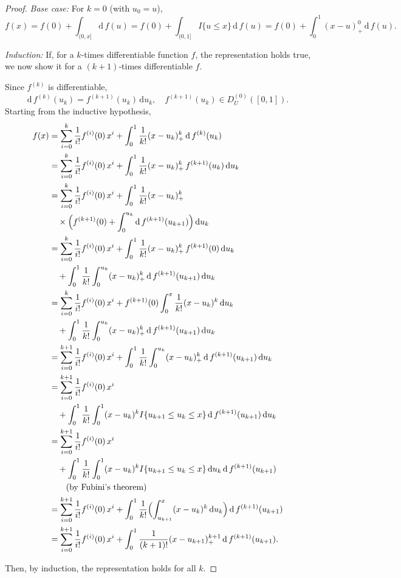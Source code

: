 \begin{proof}
\textit{Base case:} For $k = 0$ (with $u_0 = u$),
\[
  f(x)
  = f(0) + \int_{(0, x]} \mathrm{d}\,f(u)
  = f(0) + \int_{(0, 1]} I\{u \le x\}\,\mathrm{d}\,f(u)
  = f(0) + \int_0^1 (x - u)_+^0 \,\mathrm{d}\,f(u).
\]

\textit{Induction:} If, for a $k$‑times differentiable function $f$, the representation holds true, we now show it for a $(k+1)$‑times differentiable $f$.

Since $f^{(k)}$ is differentiable,
\[
  \mathrm{d}\,f^{(k)}(u_k) = f^{(k+1)}(u_k)\,\mathrm{d}u_k,
  \quad f^{(k+1)}(u_k)\in D^{(0)}_U([0,1]).
\]
Starting from the inductive hypothesis,
\begin{align*}\label{HAL_representation_formula}
  f(x)
  &= \sum_{i = 0}^k \frac{1}{i!}f^{(i)}(0)\,x^{i}
    + \int_0^1 \frac{1}{k!}(x - u_k)_+^k\,\mathrm{d}\,f^{(k)}(u_k) \\
  &= \sum_{i = 0}^k \frac{1}{i!}f^{(i)}(0)\,x^{i}
    + \int_0^1 \frac{1}{k!}(x - u_k)_+^k\,f^{(k+1)}(u_k)\,\mathrm{d}u_k \\
  &= \sum_{i = 0}^k \frac{1}{i!}f^{(i)}(0)\,x^{i}
    + \int_0^1 \frac{1}{k!}(x - u_k)_+^k \\
  &\quad \times \Bigl(f^{(k+1)}(0)
    + \int_0^{u_k} \mathrm{d}\,f^{(k+1)}(u_{k+1})\Bigr)\,\mathrm{d}u_k \\
  &= \sum_{i = 0}^k \frac{1}{i!}f^{(i)}(0)\,x^{i}
    + \int_0^1 \frac{1}{k!}(x - u_k)_+^k\,f^{(k+1)}(0)\,\mathrm{d}u_k \\
  &\quad + \int_0^1 \frac{1}{k!}\int_0^{u_k}(x - u_k)_+^k\,\mathrm{d}\,f^{(k+1)}(u_{k+1})\,\mathrm{d}u_k \\
  &= \sum_{i = 0}^k \frac{1}{i!}f^{(i)}(0)\,x^{i}
    + f^{(k+1)}(0)\int_0^x \frac{1}{k!}(x - u_k)^k\,\mathrm{d}u_k \\
  &\quad + \int_0^1 \frac{1}{k!}\int_0^{u_k}(x - u_k)_+^k\,\mathrm{d}\,f^{(k+1)}(u_{k+1})\,\mathrm{d}u_k \\
  &= \sum_{i = 0}^{k+1} \frac{1}{i!}f^{(i)}(0)\,x^{i}
    + \int_0^1 \frac{1}{k!}\int_0^{u_k}(x - u_k)_+^k\,\mathrm{d}\,f^{(k+1)}(u_{k+1})\,\mathrm{d}u_k \\
  &= \sum_{i = 0}^{k+1} \frac{1}{i!}f^{(i)}(0)\,x^{i} \\
  &\quad + \int_0^1 \frac{1}{k!}\int_0^1(x - u_k)^k I\{u_{k+1}\le u_k\le x\}\,\mathrm{d}\,f^{(k+1)}(u_{k+1})\,\mathrm{d}u_k \\
  &= \sum_{i = 0}^{k+1} \frac{1}{i!}f^{(i)}(0)\,x^{i} \\
  &\quad + \int_0^1 \frac{1}{k!}\int_0^1(x - u_k)^k I\{u_{k+1}\le u_k\le x\}\,\mathrm{d}u_k\,\mathrm{d}\,f^{(k+1)}(u_{k+1}) \\
  &\qquad\text{(by Fubini's theorem)}\\
  &= \sum_{i = 0}^{k+1} \frac{1}{i!}f^{(i)}(0)\,x^{i}
    + \int_0^1\frac{1}{k!}\Bigl(\int_{u_{k+1}}^{x}(x - u_k)^k\,\mathrm{d}u_k\Bigr)\,\mathrm{d}\,f^{(k+1)}(u_{k+1})\\
  &= \sum_{i = 0}^{k+1} \frac{1}{i!}f^{(i)}(0)\,x^{i}
    + \int_0^1\frac{1}{(k+1)!}(x - u_{k+1})_+^{k+1}\,\mathrm{d}\,f^{(k+1)}(u_{k+1}).
\end{align*}

Then, by induction, the representation holds for all \(k\).
\end{proof}